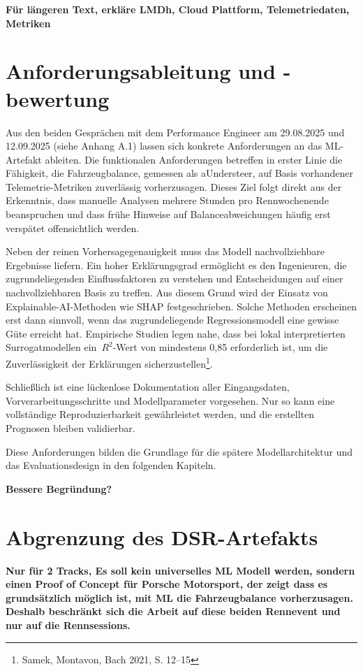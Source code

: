\textbf{Für längeren Text, erkläre LMDh, Cloud Plattform, Telemetriedaten, Metriken}

\section{Anforderungsableitung und -bewertung}


Aus den beiden Gesprächen mit dem Performance Engineer am 29.08.2025 und 12.09.2025 (siehe Anhang A.1) lassen sich konkrete Anforderungen an das ML-Artefakt ableiten. Die funktionalen Anforderungen betreffen in erster Linie die Fähigkeit, die Fahrzeugbalance, gemessen als aUndersteer, auf Basis vorhandener Telemetrie-Metriken zuverlässig vorherzusagen. Dieses Ziel folgt direkt aus der Erkenntnis, dass manuelle Analysen mehrere Stunden pro Rennwochenende beanspruchen und dass frühe Hinweise auf Balanceabweichungen häufig erst verspätet offensichtlich werden.

Neben der reinen Vorhersagegenauigkeit muss das Modell nachvollziehbare Ergebnisse liefern. Ein hoher Erklärungsgrad ermöglicht es den Ingenieuren, die zugrundeliegenden Einflussfaktoren zu verstehen und Entscheidungen auf einer nachvollziehbaren Basis zu treffen. Aus diesem Grund wird der Einsatz von Explainable-AI-Methoden wie SHAP festgeschrieben. Solche Methoden erscheinen erst dann sinnvoll, wenn das zugrundeliegende Regressionsmodell eine gewisse Güte erreicht hat. Empirische Studien legen nahe, dass bei lokal interpretierten Surrogatmodellen ein \(\,R^2\)-Wert von mindestens 0,85 erforderlich ist, um die Zuverlässigkeit der Erklärungen sicherzustellen\footnote{Samek, Montavon, Bach 2021, S. 12–15}.

Schließlich ist eine lückenlose Dokumentation aller Eingangsdaten, Vorverarbeitungs­schritte und Modellparameter vorgesehen. Nur so kann eine vollständige Reproduzierbarkeit gewährleistet werden, und die erstellten Prognosen bleiben validierbar.

Diese Anforderungen bilden die Grundlage für die spätere Modellarchitektur und das Evaluationsdesign in den folgenden Kapiteln.

\textbf{Bessere Begründung?}

\section{Abgrenzung des DSR-Artefakts}

\textbf{Nur für 2 Tracks, Es soll kein universelles ML Modell werden, sondern einen Proof of Concept für Porsche Motorsport, der zeigt dass es grundsätzlich möglich ist, mit ML die Fahrzeugbalance vorherzusagen. Deshalb beschränkt sich die Arbeit auf diese beiden Rennevent und nur auf die Rennsessions.}